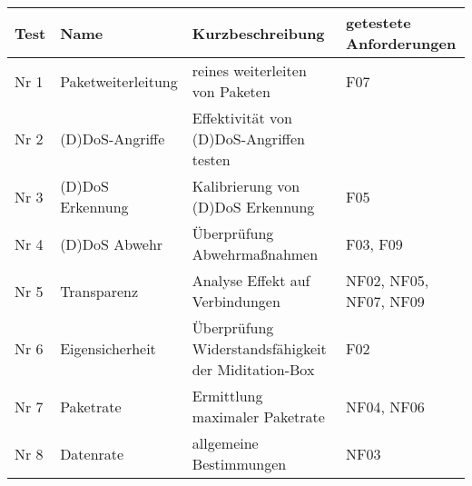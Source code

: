 \documentclass[../review_1.tex]{subfiles}
\begin{document}
\begin{longtable}[ht] {l p{3cm} p{6.5cm} p{2.5cm}}
    \textbf{Test} & \textbf{Name}      & \textbf{Kurzbeschreibung}                           & \textbf{getestete \newline Anforderungen} \\ \toprule \endhead
    Nr 1          & Paketweiterleitung & reines weiterleiten von Paketen                     & F07                                       \\
    Nr 2          & (D)DoS-Angriffe    & Effektivität von (D)DoS-Angriffen testen            &                                           \\
    Nr 3          & (D)DoS Erkennung   & Kalibrierung von (D)DoS Erkennung                   & F05                                       \\
    Nr 4          & (D)DoS Abwehr      & Überprüfung Abwehrmaßnahmen                         & F03, F09                                  \\
    Nr 5          & Transparenz        & Analyse Effekt auf Verbindungen                     & NF02, NF05, NF07, NF09                    \\
    Nr 6          & Eigensicherheit    & Überprüfung Widerstandsfähigkeit der Miditation-Box & F02                                       \\
    Nr 7          & Paketrate          & Ermittlung maximaler Paketrate                      & NF04, NF06                                \\
    Nr 8          & Datenrate          & allgemeine Bestimmungen                             & NF03                                      \\ \bottomrule
\end{longtable}
\end{document}
